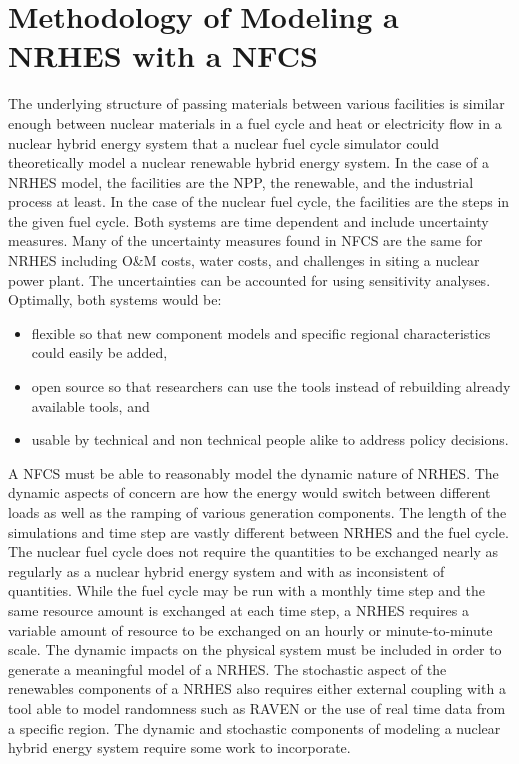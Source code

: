 \documentclass[12pt]{UIdahoMastersThesis}
\begin{document}
\chapter{Methodology of Modeling a NRHES with a NFCS}
The underlying structure of passing materials between various facilities is similar enough between nuclear materials in a fuel cycle and heat or electricity flow in a nuclear hybrid energy system that a nuclear fuel cycle simulator could theoretically model a nuclear renewable hybrid energy system. In the case of a NRHES model, the facilities are the NPP, the renewable, and the industrial process at least.  In the case of the nuclear fuel cycle, the facilities are the steps in the given fuel cycle. Both systems are time dependent and include uncertainty measures. Many of the uncertainty measures found in NFCS are the same for NRHES including O\&M costs, water costs, and challenges in siting a nuclear power plant. The uncertainties can be accounted for using sensitivity analyses. Optimally, both systems would be:
\begin{itemize}

\item flexible so that new component models and specific regional characteristics could easily be added,
\item open source so that researchers can use the tools instead of rebuilding already available tools, and
\item usable by technical and non technical people alike to address policy decisions.
\end{itemize}

A NFCS must be able to reasonably model the dynamic nature of NRHES. The dynamic aspects of concern are how the energy would switch between different loads as well as the ramping of various generation components.  The length of the simulations and time step are vastly different between NRHES and the fuel cycle. The nuclear fuel cycle does not require the quantities to be exchanged nearly as regularly as a nuclear hybrid energy system and with as inconsistent of quantities. While the fuel cycle may be run with a monthly time step and the same resource amount is exchanged at each time step, a NRHES requires a variable amount of resource to be exchanged on an hourly or minute-to-minute scale. The dynamic impacts on the physical system must be included in order to generate a meaningful model of a NRHES. The stochastic aspect of the renewables components of a NRHES also requires either external coupling with a tool able to model randomness such as RAVEN or the use of real time data from a specific region. The dynamic and stochastic components of modeling a nuclear hybrid energy system require some work to incorporate.
\end{document}
